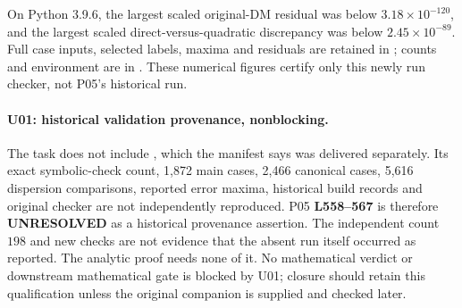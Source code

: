 \documentclass[11pt]{article}
\newcommand{\lin}[1]{\textbf{L#1}}
\begin{document}
On Python 3.9.6, the largest scaled original-DM residual was below
$3.18\times10^{-120}$, and the largest scaled direct-versus-quadratic
discrepancy was below $2.45\times10^{-89}$. Full case inputs, selected
labels, maxima and residuals are retained in
; counts and environment are in
. These numerical figures certify only
this newly run checker, not P05's historical run.

\paragraph{U01: historical validation provenance, nonblocking.}
The task does not include , which the
manifest says was delivered separately. Its exact symbolic-check count,
1,872 main cases, 2,466 canonical cases, 5,616 dispersion comparisons,
reported error maxima, historical build records and original checker are
not independently reproduced. P05 \lin{558--567} is therefore
\textbf{UNRESOLVED} as a historical provenance assertion. The independent
count $198$ and new checks are not evidence that the absent run itself
occurred as reported. The analytic proof needs none of it. No mathematical
verdict or downstream mathematical gate is blocked by U01; closure should
retain this qualification unless the original companion is supplied and
checked later.
\end{document}
